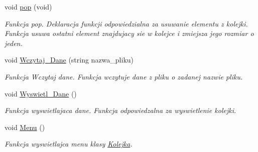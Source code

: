 \begin{DoxyCompactItemize}
void \hyperlink{class_kolejka_a9a637b21a46f6330d774f03e16bd003e}{pop} (void)
\begin{DoxyCompactList}\small\item\em \-Funkcja pop. \-Deklaracja funkcji odpowiedzialna za usuwanie elementu z kolejki. \-Funkcja usuwa ostatni element znajdujacy sie w kolejce i zmiejsza jego rozmiar o jeden. \end{DoxyCompactList}\item 
void \hyperlink{class_kolejka_a449374680f4f4cc633f067c4fb0fac3d}{\-Wczytaj\-\_\-\-Dane} (string nazwa\-\_\-pliku)
\begin{DoxyCompactList}\small\item\em \-Funkcja \-Wczytaj dane. \-Funkcja wczytuje dane z pliku o zadanej nazwie pliku. \end{DoxyCompactList}\item 
void \hyperlink{class_kolejka_a2feb88aa9e6b9af5c14e6e9fde851966}{\-Wyswietl\-\_\-\-Dane} ()
\begin{DoxyCompactList}\small\item\em \-Funkcja wyswietlajaca dane. \-Funkcja odpowiedzalna za wyswietlenie kolejki. \end{DoxyCompactList}\item 
void \hyperlink{class_kolejka_adf3fa87d0693b7f11835e8a67d2efcc1}{\-Menu} ()
\begin{DoxyCompactList}\small\item\em \-Funkcja wyswietlajca menu klasy \hyperlink{class_kolejka}{\-Kolejka}. \end{DoxyCompactList}\end{DoxyCompactItemize}
